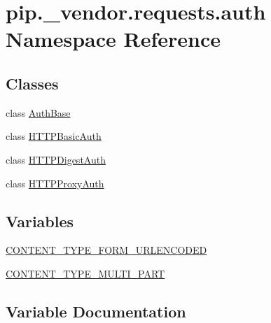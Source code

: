 \hypertarget{namespacepip_1_1__vendor_1_1requests_1_1auth}{}\section{pip.\+\_\+vendor.\+requests.\+auth Namespace Reference}
\label{namespacepip_1_1__vendor_1_1requests_1_1auth}
\subsection*{Classes}
\begin{DoxyCompactItemize}
\item 
class \hyperlink{classpip_1_1__vendor_1_1requests_1_1auth_1_1AuthBase}{Auth\+Base}
\item 
class \hyperlink{classpip_1_1__vendor_1_1requests_1_1auth_1_1HTTPBasicAuth}{H\+T\+T\+P\+Basic\+Auth}
\item 
class \hyperlink{classpip_1_1__vendor_1_1requests_1_1auth_1_1HTTPDigestAuth}{H\+T\+T\+P\+Digest\+Auth}
\item 
class \hyperlink{classpip_1_1__vendor_1_1requests_1_1auth_1_1HTTPProxyAuth}{H\+T\+T\+P\+Proxy\+Auth}
\end{DoxyCompactItemize}
\subsection*{Variables}
\begin{DoxyCompactItemize}
\item 
\hyperlink{namespacepip_1_1__vendor_1_1requests_1_1auth_a831e6ad1a9dd203358bf07d7c9f866f2}{C\+O\+N\+T\+E\+N\+T\+\_\+\+T\+Y\+P\+E\+\_\+\+F\+O\+R\+M\+\_\+\+U\+R\+L\+E\+N\+C\+O\+D\+ED}
\item 
\hyperlink{namespacepip_1_1__vendor_1_1requests_1_1auth_a4e887bf4df4a33cac5cc6142fc705c1f}{C\+O\+N\+T\+E\+N\+T\+\_\+\+T\+Y\+P\+E\+\_\+\+M\+U\+L\+T\+I\+\_\+\+P\+A\+RT}
\end{DoxyCompactItemize}


\subsection{Variable Documentation}
\mbox{\label{namespacepip_1_1__vendor_1_1requests_1_1auth_a831e6ad1a9dd203358bf07d7c9f866f2}} 
